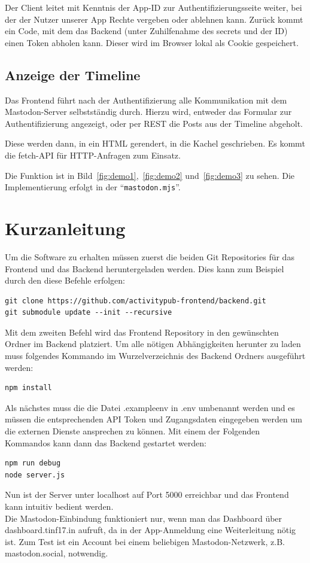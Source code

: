 \documentclass[fleqn,10pt]{SelfArx} %
\begin{document}
Der Client leitet mit Kenntnis der App-ID zur Authentifizierungsseite weiter, bei der der Nutzer unserer App Rechte vergeben oder ablehnen kann. Zurück kommt ein Code, mit dem das Backend (unter Zuhilfenahme des secrets und der ID) einen Token abholen kann. Dieser wird im Browser lokal als Cookie gespeichert.
\subsection{Anzeige der Timeline}
Das Frontend führt nach der Authentifizierung alle Kommunikation mit dem Mastodon-Server selbstständig durch. Hierzu wird, entweder das Formular zur Authentifizierung angezeigt, oder per REST die Posts aus der Timeline abgeholt.

Diese werden dann, in ein HTML gerendert, in die Kachel geschrieben. Es kommt die fetch-API für HTTP-Anfragen zum Einsatz.

Die Funktion ist in Bild~\ref{fig:demo1},~\ref{fig:demo2} und~\ref{fig:demo3} zu sehen. Die Implementierung erfolgt in der \enquote{\texttt{mastodon.mjs}}.

\section{Kurzanleitung}
Um die Software zu erhalten müssen zuerst die beiden Git Repositories für das Frontend und das Backend heruntergeladen werden. Dies kann zum Beispiel durch den diese Befehle erfolgen:
\begin{lstlisting}
git clone https://github.com/activitypub-frontend/backend.git
git submodule update --init --recursive
\end{lstlisting}
Mit dem zweiten Befehl wird das Frontend Repository in den gewünschten Ordner im Backend platziert.
Um alle nötigen Abhängigkeiten herunter zu laden muss folgendes Kommando im Wurzelverzeichnis des Backend Ordners ausgeführt werden:
\begin{lstlisting}
npm install
\end{lstlisting}
Als nächstes muss die die Datei .exampleenv in .env umbenannt werden und es müssen die entsprechenden API Token und Zugangsdaten eingegeben werden um die externen Dienste ansprechen zu können.
Mit einem der Folgenden Kommandos kann dann das Backend gestartet werden:
\begin{lstlisting}
npm run debug
node server.js
\end{lstlisting}
Nun ist der Server unter localhost auf Port 5000 erreichbar und das Frontend kann intuitiv bedient werden.  \\
Die Mastodon-Einbindung funktioniert  nur, wenn man das Dashboard über dashboard.tinf17.in aufruft, da in der App-Anmeldung eine Weiterleitung nötig ist. Zum Test ist ein Account bei einem beliebigen Mastodon-Netzwerk, z.B. mastodon.social, notwendig.
\end{document}
